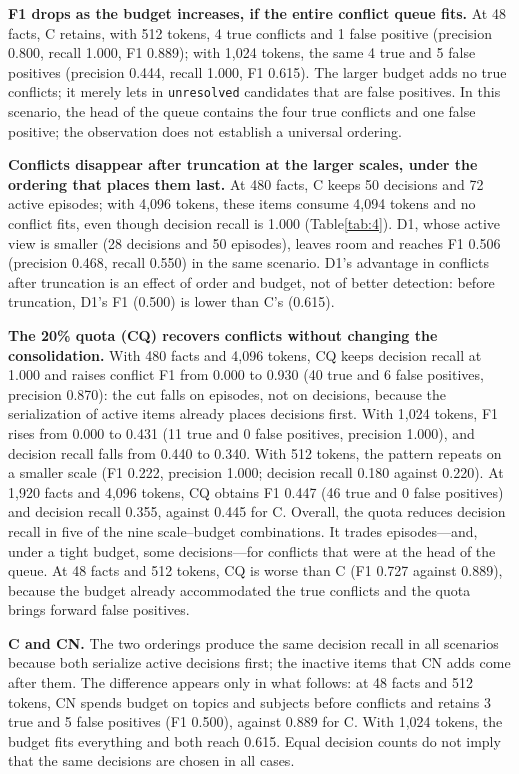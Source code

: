 \documentclass[11pt,a4paper]{article}
\begin{document}
\textbf{F1 drops as the budget increases, if the entire conflict queue fits.} At 48 facts, C retains, with 512 tokens, 4 true conflicts and 1 false positive (precision 0.800, recall 1.000, F1 0.889); with 1,024 tokens, the same 4 true and 5 false positives (precision 0.444, recall 1.000, F1 0.615). The larger budget adds no true conflicts; it merely lets in \texttt{unresolved} candidates that are false positives. In this scenario, the head of the queue contains the four true conflicts and one false positive; the observation does not establish a universal ordering.

\textbf{Conflicts disappear after truncation at the larger scales, under the ordering that places them last.} At 480 facts, C keeps 50 decisions and 72 active episodes; with 4,096 tokens, these items consume 4,094 tokens and no conflict fits, even though decision recall is 1.000 (Table\nobreakspace{}\ref{tab:4}). D1, whose active view is smaller (28 decisions and 50 episodes), leaves room and reaches F1 0.506 (precision 0.468, recall 0.550) in the same scenario. D1's advantage in conflicts after truncation is an effect of order and budget, not of better detection: before truncation, D1's F1 (0.500) is lower than C's (0.615).

\textbf{The 20\% quota (CQ) recovers conflicts without changing the consolidation.} With 480 facts and 4,096 tokens, CQ keeps decision recall at 1.000 and raises conflict F1 from 0.000 to 0.930 (40 true and 6 false positives, precision 0.870): the cut falls on episodes, not on decisions, because the serialization of active items already places decisions first. With 1,024 tokens, F1 rises from 0.000 to 0.431 (11 true and 0 false positives, precision 1.000), and decision recall falls from 0.440 to 0.340. With 512 tokens, the pattern repeats on a smaller scale (F1 0.222, precision 1.000; decision recall 0.180 against 0.220). At 1,920 facts and 4,096 tokens, CQ obtains F1 0.447 (46 true and 0 false positives) and decision recall 0.355, against 0.445 for C. Overall, the quota reduces decision recall in five of the nine scale--budget combinations. It trades episodes---and, under a tight budget, some decisions---for conflicts that were at the head of the queue. At 48 facts and 512 tokens, CQ is worse than C (F1 0.727 against 0.889), because the budget already accommodated the true conflicts and the quota brings forward false positives.

\textbf{C and CN.} The two orderings produce the same decision recall in all scenarios because both serialize active decisions first; the inactive items that CN adds come after them. The difference appears only in what follows: at 48 facts and 512 tokens, CN spends budget on topics and subjects before conflicts and retains 3 true and 5 false positives (F1 0.500), against 0.889 for C. With 1,024 tokens, the budget fits everything and both reach 0.615. Equal decision counts do not imply that the same decisions are chosen in all cases.
\end{document}

